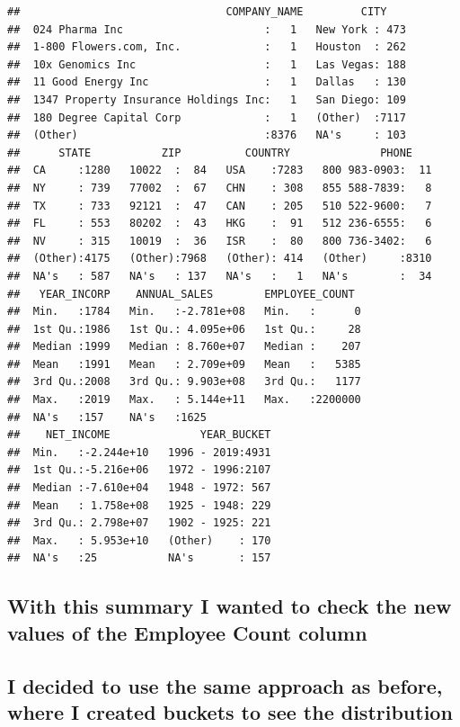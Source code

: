 \documentclass[]{article}
\begin{document}
\begin{verbatim}
##                                COMPANY_NAME         CITY     
##  024 Pharma Inc                      :   1   New York : 473  
##  1-800 Flowers.com, Inc.             :   1   Houston  : 262  
##  10x Genomics Inc                    :   1   Las Vegas: 188  
##  11 Good Energy Inc                  :   1   Dallas   : 130  
##  1347 Property Insurance Holdings Inc:   1   San Diego: 109  
##  180 Degree Capital Corp             :   1   (Other)  :7117  
##  (Other)                             :8376   NA's     : 103  
##      STATE           ZIP          COUNTRY              PHONE     
##  CA     :1280   10022  :  84   USA    :7283   800 983-0903:  11  
##  NY     : 739   77002  :  67   CHN    : 308   855 588-7839:   8  
##  TX     : 733   92121  :  47   CAN    : 205   510 522-9600:   7  
##  FL     : 553   80202  :  43   HKG    :  91   512 236-6555:   6  
##  NV     : 315   10019  :  36   ISR    :  80   800 736-3402:   6  
##  (Other):4175   (Other):7968   (Other): 414   (Other)     :8310  
##  NA's   : 587   NA's   : 137   NA's   :   1   NA's        :  34  
##   YEAR_INCORP    ANNUAL_SALES        EMPLOYEE_COUNT   
##  Min.   :1784   Min.   :-2.781e+08   Min.   :      0  
##  1st Qu.:1986   1st Qu.: 4.095e+06   1st Qu.:     28  
##  Median :1999   Median : 8.760e+07   Median :    207  
##  Mean   :1991   Mean   : 2.709e+09   Mean   :   5385  
##  3rd Qu.:2008   3rd Qu.: 9.903e+08   3rd Qu.:   1177  
##  Max.   :2019   Max.   : 5.144e+11   Max.   :2200000  
##  NA's   :157    NA's   :1625                          
##    NET_INCOME              YEAR_BUCKET  
##  Min.   :-2.244e+10   1996 - 2019:4931  
##  1st Qu.:-5.216e+06   1972 - 1996:2107  
##  Median :-7.610e+04   1948 - 1972: 567  
##  Mean   : 1.758e+08   1925 - 1948: 229  
##  3rd Qu.: 2.798e+07   1902 - 1925: 221  
##  Max.   : 5.953e+10   (Other)    : 170  
##  NA's   :25           NA's       : 157
\end{verbatim}

\hypertarget{with-this-summary-i-wanted-to-check-the-new-values-of-the-employee-count-column}{%
\subsection{With this summary I wanted to check the new values of the
Employee Count
column}\label{with-this-summary-i-wanted-to-check-the-new-values-of-the-employee-count-column}}

\hypertarget{i-decided-to-use-the-same-approach-as-before-where-i-created-buckets-to-see-the-distribution}{%
\subsection{I decided to use the same approach as before, where I
created buckets to see the
distribution}\label{i-decided-to-use-the-same-approach-as-before-where-i-created-buckets-to-see-the-distribution}}
\end{document}
